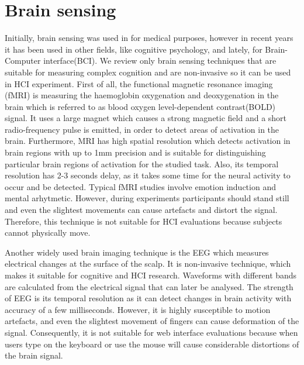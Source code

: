 \documentclass[a4paper]{report}
\begin{document}
	\section{Brain sensing}
	Initially, brain sensing was used in for medical purposes, however in recent years it has been used in other fields, like cognitive psychology, and lately, for Brain-Computer interface(BCI). We review only brain sensing techniques that are suitable for measuring complex cognition and are non-invasive so it can be used in HCI experiment. First of all, the functional magnetic resonance imaging (fMRI) is measuring the haemoglobin oxygenation and deoxygenation in the brain which is referred to as blood oxygen level-dependent contrast(BOLD) signal. It uses a large magnet which causes a strong magnetic field and a short radio-frequency pulse is emitted, in order to detect areas of activation in the brain. Furthermore, MRI has high spatial resolution which detects activation in brain regions with up to 1mm precision and is suitable for distinguishing particular brain regions of activation for the studied task. Also, its temporal resolution has 2-3 seconds delay, as it takes some time for the neural activity to occur and be detected. Typical fMRI studies involve emotion induction\cite{phan2002functional,brattico2011functional} and mental arhytmetic\cite{kawashima2004functional}. However, during experiments participants should stand still and even the slightest movements can cause artefacts and distort the signal. Therefore, this technique is not suitable for HCI evaluations because subjects cannot physically move.
	
	Another widely used brain imaging technique is the EEG which measures electrical changes at the surface of the scalp. It is non-invasive technique, which makes it suitable for cognitive and HCI research. Waveforms with different bands are calculated from the electrical signal that can later be analysed. The strength of EEG is its temporal resolution as it can detect changes in brain activity with accuracy of a few milliseconds. However, it is highly susceptible to motion artefacts, and even the slightest movement of fingers can cause deformation of the signal. Consequently, it is not suitable for web interface evaluations because when users type on the keyboard or use the mouse will cause considerable distortions of the brain signal. 
	
\end{document}
